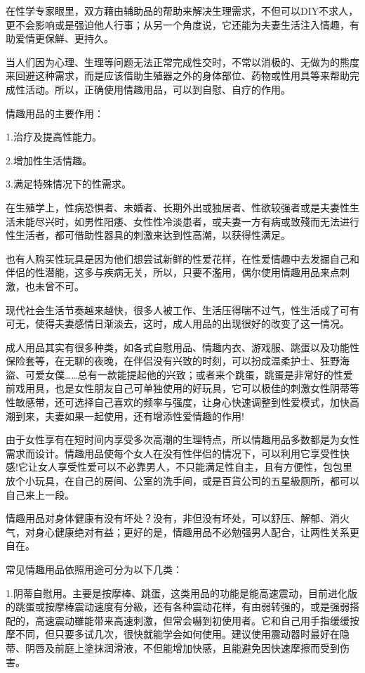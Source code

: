 \documentclass[12pt,UTF8]{ctexbook}
\begin{document}
在性学专家眼里，双方藉由辅助品的帮助来解决生理需求，不但可以DIY不求人，更不会影响或是强迫他人行事；从另一个角度说，它还能为夫妻生活注入情趣，有助爱情更保鮮、更持久。

当人们因为心理、生理等问题无法正常完成性交时，不常以消极的、无做为的熊度来回避这种需求，而是应该借助生殖器之外的身体部位、药物或性用具等来帮助完成性活动。所以，正确使用情趣用品，可以到自慰、自疗的作用。

情趣用品的主要作用：

1.治疗及提高性能力。

2.增加性生活情趣。

3.满足特殊情况下的性需求。

在生殖学上，性病恐惧者、未婚者、长期外出或独居者、性欲较强者或是夫妻性生活未能尽兴时，如男性阳痿、女性性冷淡患者，或夫妻一方有病或致殘而无法进行性生活者，都可借助性器具的刺激来达到性高潮，以获得性满足。

也有人购买性玩具是因为他们想尝试新鲜的性爱花样，在性爱情趣中去发掘自己和伴侣的性潜能，这多与疾病无关，所以，只要不濫用，偶尔使用情趣用品来点刺激，也未曾不可。

现代社会生活节奏越来越快，很多人被工作、生活压得喘不过气，性生活成了可有可无，使得夫妻感情日渐淡去，这时，成人用品的出现很好的改变了这一情况。

成人用品其实有很多种类，如各式自慰用品、情趣内衣、游戏服、跳蛋以及功能性保险套等，在无聊的夜晚，在伴侣没有兴致的时刻，可以扮成温柔护士、狂野海盜、可爱女僕……总有一款能提起他的兴致；或者来个跳蛋，跳蛋是非常好的性爱前戏用具，也是女性朋友自己可单独使用的好玩具，它可以极佳的刺激女性阴蒂等性敏感带，还可选择自己喜欢的频率与强度，让身心快速调整到性爱模式，加快高潮到来，夫妻如果一起使用，还有增添性爱情趣的作用!

由于女性享有在短时间内享受多次高潮的生理特点，所以情趣用品多数都是为女性需求而设计。情趣用品使每个女人在没有性伴侣的情况下，可以利用它享受性快感!它让女人享受性爱可以不必靠男人，不只能满足性自主，且有方便性，包包里放个小玩具，在自己的房间、公室的洗手间，或是百貨公司的五星級厕所，都可以自己来上一段。

情趣用品对身体健康有没有坏处？没有，非但没有坏处，可以舒压、解郁、消火气，对身心健康绝对有益；更好的是，情趣用品不必勉强男人配合，让两性关系更自在。

常见情趣用品依照用途可分为以下几类：

1.阴蒂自慰用。主要是按摩棒、跳蛋，这类用品的功能是能高速震动，目前进化版的跳蛋或按摩棒震动速度有分級，还有各种震动花样，有由弱转强的，或是强弱搭配的，高速震动雖能带来高速刺激，但常会嚇到初使用者。它和自己用手指缓缓按摩不同，但只要多试几次，很快就能学会如何使用。建议使用震动器时最好在隐蒂、阴唇及前庭上塗抹润滑液，不但能增加快感，且能避免因快速摩擦而受到伤害。
\end{document}
